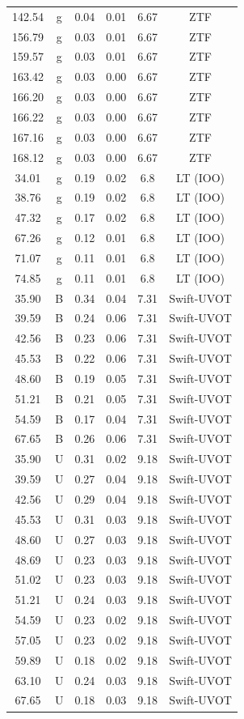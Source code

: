 \documentclass{nature_plusfigure}
\begin{document}
\begin{methods}
\begin{longtable}{|c|c|c|c|c|c|}
142.54&g&0.04&0.01&6.67&ZTF\\%
156.79&g&0.03&0.01&6.67&ZTF\\%
159.57&g&0.03&0.01&6.67&ZTF\\%
163.42&g&0.03&0.00&6.67&ZTF\\%
166.20&g&0.03&0.00&6.67&ZTF\\%
166.22&g&0.03&0.00&6.67&ZTF\\%
167.16&g&0.03&0.00&6.67&ZTF\\%
168.12&g&0.03&0.00&6.67&ZTF\\%
34.01&g&0.19&0.02&6.8&LT (IOO)\\%
38.76&g&0.19&0.02&6.8&LT (IOO)\\%
47.32&g&0.17&0.02&6.8&LT (IOO)\\%
67.26&g&0.12&0.01&6.8&LT (IOO)\\%
71.07&g&0.11&0.01&6.8&LT (IOO)\\%
74.85&g&0.11&0.01&6.8&LT (IOO)\\%
35.90&B&0.34&0.04&7.31&Swift{-}UVOT\\%
39.59&B&0.24&0.06&7.31&Swift{-}UVOT\\%
42.56&B&0.23&0.06&7.31&Swift{-}UVOT\\%
45.53&B&0.22&0.06&7.31&Swift{-}UVOT\\%
48.60&B&0.19&0.05&7.31&Swift{-}UVOT\\%
51.21&B&0.21&0.05&7.31&Swift{-}UVOT\\%
54.59&B&0.17&0.04&7.31&Swift{-}UVOT\\%
67.65&B&0.26&0.06&7.31&Swift{-}UVOT\\%
35.90&U&0.31&0.02&9.18&Swift{-}UVOT\\%
39.59&U&0.27&0.04&9.18&Swift{-}UVOT\\%
42.56&U&0.29&0.04&9.18&Swift{-}UVOT\\%
45.53&U&0.31&0.03&9.18&Swift{-}UVOT\\%
48.60&U&0.27&0.03&9.18&Swift{-}UVOT\\%
48.69&U&0.23&0.03&9.18&Swift{-}UVOT\\%
51.02&U&0.23&0.03&9.18&Swift{-}UVOT\\%
51.21&U&0.24&0.03&9.18&Swift{-}UVOT\\%
54.59&U&0.23&0.02&9.18&Swift{-}UVOT\\%
57.05&U&0.23&0.02&9.18&Swift{-}UVOT\\%
59.89&U&0.18&0.02&9.18&Swift{-}UVOT\\%
63.10&U&0.24&0.03&9.18&Swift{-}UVOT\\%
67.65&U&0.18&0.03&9.18&Swift{-}UVOT\\%

\end{longtable}
\end{methods}
\end{document}
